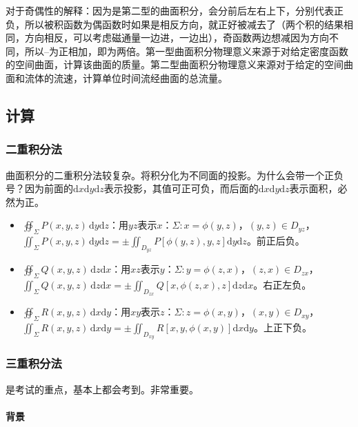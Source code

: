 \documentclass[UTF8, 12pt]{ctexart}
\begin{document}
对于奇偶性的解释：因为是第二型的曲面积分，会分前后左右上下，分别代表正负，所以被积函数为偶函数时如果是相反方向，就正好被减去了（两个积的结果相同，方向相反，可以考虑磁通量一边进，一边出），奇函数两边想减因为方向不同，所以--为正相加，即为两倍。第一型曲面积分物理意义来源于对给定密度函数的空间曲面，计算该曲面的质量。第二型曲面积分物理意义来源对于给定的空间曲面和流体的流速，计算单位时间流经曲面的总流量。

\subsection{计算}

\subsubsection{二重积分法}

曲面积分的二重积分法较复杂。将积分化为不同面的投影。为什么会带一个正负号？因为前面的$\textrm{d}x\textrm{d}y\textrm{d}z$表示投影，其值可正可负，而后面的$\textrm{d}x\textrm{d}y\textrm{d}z$表示面积，必然为正。

\begin{itemize}
    \item $\oiint_\Sigma P(x,y,z)\,\textrm{d}y\textrm{d}z$：用$yz$表示$x$：$\Sigma:x=\phi(y,z)$，$(y,z)\in D_{yz}$，\\$\iint_\Sigma P(x,y,z)\,\textrm{d}y\textrm{d}z=\pm\iint_{D_{yz}}P[\phi(y,z),y,z]\textrm{d}y\textrm{d}z$。前正后负。
    \item $\oiint_\Sigma Q(x,y,z)\,\textrm{d}z\textrm{d}x$：用$xz$表示$y$：$\Sigma:y=\phi(z,x)$，$(z,x)\in D_{zx}$，\\$\iint_\Sigma Q(x,y,z)\,\textrm{d}z\textrm{d}x=\pm\iint_{D_{zx}}Q[x,\phi(z,x),z]\textrm{d}z\textrm{d}x$。右正左负。
    \item $\oiint_\Sigma R(x,y,z)\,\textrm{d}x\textrm{d}y$：用$xy$表示$z$：$\Sigma:z=\phi(x,y)$，$(x,y)\in D_{xy}$，\\$\iint_\Sigma R(x,y,z)\,\textrm{d}x\textrm{d}y=\pm\iint_{D_{xy}}R[x,y,\phi(x,y)]\textrm{d}x\textrm{d}y$。上正下负。
\end{itemize}

\subsubsection{三重积分法}

是考试的重点，基本上都会考到。非常重要。

\paragraph{背景} \leavevmode \medskip
\end{document}

